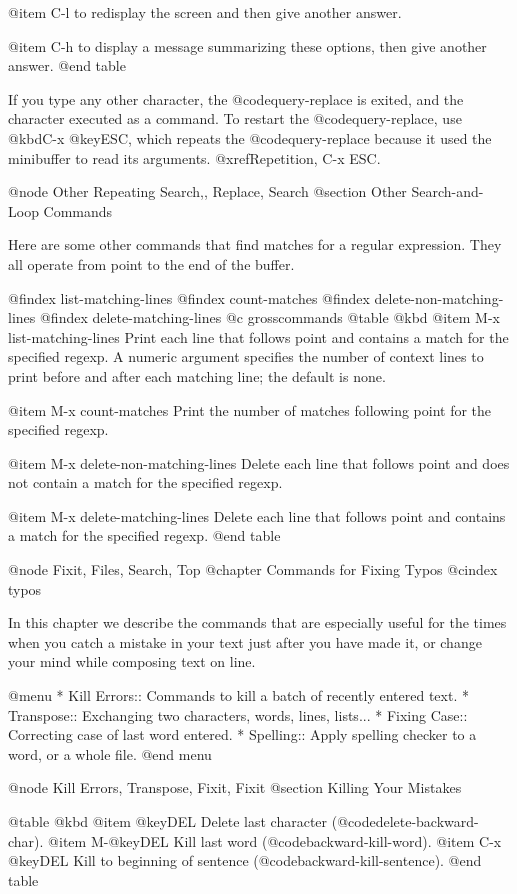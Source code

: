 {{{{{{{{{{{{{{{{{{{@item C-l
to redisplay the screen and then give another answer.

@item C-h
to display a message summarizing these options, then give another
answer.
@end table

  If you type any other character, the @code{query-replace} is exited, and
the character executed as a command.  To restart the @code{query-replace},
use @kbd{C-x @key{ESC}}, which repeats the @code{query-replace} because it
used the minibuffer to read its arguments.  @xref{Repetition, C-x ESC}.
  
@node Other Repeating Search,, Replace, Search
@section Other Search-and-Loop Commands

  Here are some other commands that find matches for a regular expression.
They all operate from point to the end of the buffer.

@findex list-matching-lines
@findex count-matches
@findex delete-non-matching-lines
@findex delete-matching-lines
@c grosscommands
@table @kbd
@item M-x list-matching-lines
Print each line that follows point and contains a match for the
specified regexp.  A numeric argument specifies the number of context
lines to print before and after each matching line; the default is
none.

@item M-x count-matches
Print the number of matches following point for the specified regexp.

@item M-x delete-non-matching-lines
Delete each line that follows point and does not contain a match for
the specified regexp.

@item M-x delete-matching-lines
Delete each line that follows point and contains a match for the
specified regexp.
@end table

@node Fixit, Files, Search, Top
@chapter Commands for Fixing Typos
@cindex typos

  In this chapter we describe the commands that are especially useful for
the times when you catch a mistake in your text just after you have made
it, or change your mind while composing text on line.

@menu
* Kill Errors:: Commands to kill a batch of recently entered text.
* Transpose::   Exchanging two characters, words, lines, lists...
* Fixing Case:: Correcting case of last word entered.
* Spelling::    Apply spelling checker to a word, or a whole file.
@end menu

@node Kill Errors, Transpose, Fixit, Fixit
@section Killing Your Mistakes

@table @kbd
@item @key{DEL}
Delete last character (@code{delete-backward-char}).
@item M-@key{DEL}
Kill last word (@code{backward-kill-word}).
@item C-x @key{DEL}
Kill to beginning of sentence (@code{backward-kill-sentence}).
@end table

}}}}}}}}}}}}}}}}}}}
